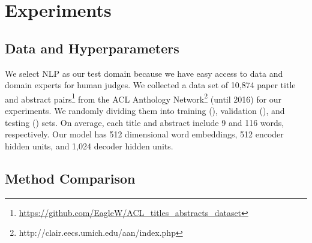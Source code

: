 \documentclass[11pt,a4paper]{article}
\begin{document}
 \section{Experiments}
\subsection{Data and Hyperparameters}
\label{data}
We select NLP as our test domain because we have easy access to data and domain experts for human judges. We collected a data set of 10,874 paper title and abstract pairs\footnote{\url{https://github.com/EagleW/ACL_titles_abstracts_dataset}} from the ACL Anthology Network\footnote{http://clair.eecs.umich.edu/aan/index.php} (until 2016) for our experiments. We randomly dividing them into training (), validation (), and testing () sets. On average, each title and abstract include 9 and 116 words, respectively. Our model has 512 dimensional word embeddings, 512 encoder hidden units, and 1,024 decoder hidden units.



















%
 \subsection{Method Comparison}

\label{Baselines}
\end{document}
